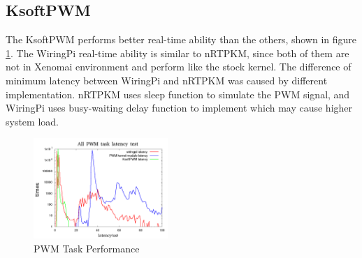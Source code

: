 \documentclass[conference]{IEEEtran}
\begin{document}
\subsection{KsoftPWM}

The KsoftPWM performs better real-time ability than the others, shown in figure \ref{fig:ksoftpwm_perf}. The WiringPi real-time ability is similar to nRTPKM, since both of them are not in Xenomai environment and perform like the stock kernel. The difference of minimum latency between WiringPi and nRTPKM was caused by different implementation. nRTPKM uses sleep function to simulate the PWM signal, and WiringPi uses busy-waiting delay function to implement which may cause higher system load.

\begin{figure}
	\centering
	\includegraphics[width=2in]{img/ksoftpwm_load.png}
	\caption{PWM Task Performance}
	\label{fig:ksoftpwm_perf}
\end{figure}



\end{document}
